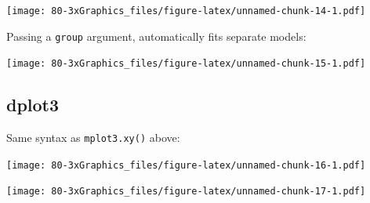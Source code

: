 \documentclass[
]{book}
\newenvironment{Shaded}{\begin{snugshade}}{\end{snugshade}}
\newcommand{\AttributeTok}[1]{\textcolor[rgb]{0.77,0.63,0.00}{#1}}
\newcommand{\FunctionTok}[1]{\textcolor[rgb]{0.00,0.00,0.00}{#1}}
\newcommand{\NormalTok}[1]{#1}
\newcommand{\SpecialCharTok}[1]{\textcolor[rgb]{0.00,0.00,0.00}{#1}}
\newcommand{\StringTok}[1]{\textcolor[rgb]{0.31,0.60,0.02}{#1}}
\begin{document}
\texttt{[image: 80-3xGraphics\_files/figure-latex/unnamed-chunk-14-1.pdf]}

Passing a \texttt{group} argument, automatically fits separate models:

\begin{Shaded}
\end{Shaded}

\texttt{[image: 80-3xGraphics\_files/figure-latex/unnamed-chunk-15-1.pdf]}

\hypertarget{dplot3-1}{%
\subsection{\texorpdfstring{\textbf{dplot3}}{dplot3}}\label{dplot3-1}}

Same syntax as \texttt{mplot3.xy()} above:

\begin{Shaded}
\end{Shaded}

\texttt{[image: 80-3xGraphics\_files/figure-latex/unnamed-chunk-16-1.pdf]}

\begin{Shaded}
\end{Shaded}

\texttt{[image: 80-3xGraphics\_files/figure-latex/unnamed-chunk-17-1.pdf]}
\end{document}
